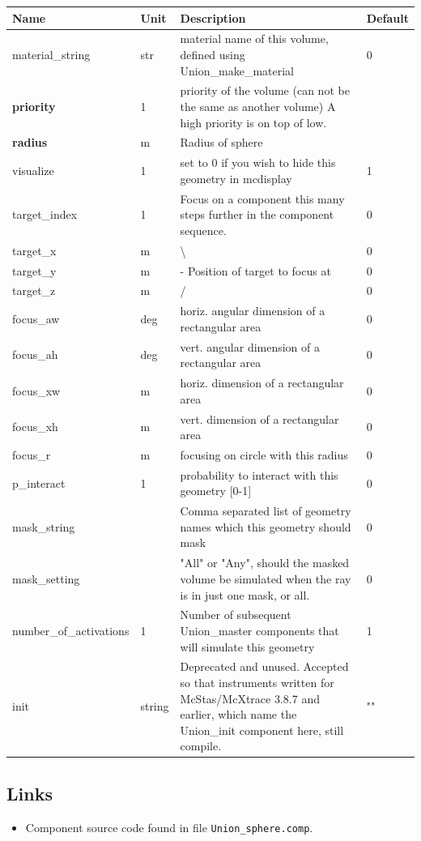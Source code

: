 \begin{longtable}{p{}p{}p{}p{}}
\toprule
\textbf{Name} & \textbf{Unit} & \textbf{Description} & \textbf{Default} \\
\midrule
\endhead
material\_string & str & material name of this volume, defined using Union\_make\_material & 0 \\
\textbf{priority} & 1 & priority of the volume (can not be the same as another volume) A high priority is on top of low. &  \\
\textbf{radius} & m & Radius of sphere &  \\
visualize & 1 & set to 0 if you wish to hide this geometry in mcdisplay & 1 \\
target\_index & 1 & Focus on a component this many steps further in the component sequence. & 0 \\
target\_x & m & \textbackslash{} & 0 \\
target\_y & m & - Position of target to focus at & 0 \\
target\_z & m & / & 0 \\
focus\_aw & deg & horiz. angular dimension of a rectangular area & 0 \\
focus\_ah & deg & vert. angular dimension of a rectangular area & 0 \\
focus\_xw & m & horiz. dimension of a rectangular area & 0 \\
focus\_xh & m & vert. dimension of a rectangular area & 0 \\
focus\_r & m & focusing on circle with this radius & 0 \\
p\_interact & 1 & probability to interact with this geometry [0-1] & 0 \\
mask\_string &  & Comma separated list of geometry names which this geometry should mask & 0 \\
mask\_setting &  & "All" or "Any", should the masked volume be simulated when the ray is in just one mask, or all. & 0 \\
number\_of\_activations & 1 & Number of subsequent Union\_master components that will simulate this geometry & 1 \\
init & string & Deprecated and unused. Accepted so that instruments written for McStas/McXtrace 3.8.7 and earlier, which name the Union\_init component here, still compile. & "" \\
\bottomrule
\end{longtable}

\subsection*{Links}
\begin{itemize}
  \item Component source code found in file \texttt{Union\_sphere.comp}.
\end{itemize}
